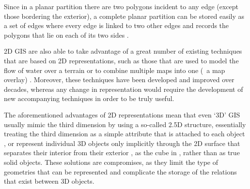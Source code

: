 Since in a planar partition there are two polygons incident to any edge (except those bordering the exterior), a complete planar partition can be stored easily as a set of edges where every edge is linked to two other edges and records the polygons that lie on each of its two sides \citep{Peucker75}.


2D GIS are also able to take advantage of a great number of existing techniques that are based on 2D representations, such as those that are used to model the flow of water over a terrain \citep{vanKreveld97} or to combine multiple maps into one (\ie\ a map overlay) \citep[\S{}2.3]{deBerg08}.
Moreover, these techniques have been developed and improved over decades, whereas any change in representation would require the development of new accompanying techniques in order to be truly useful.


The aforementioned advantages of 2D representations mean that even `3D' GIS usually mimic the third dimension by using a so-called 2.5D structure, essentially treating the third dimension as a simple attribute that is attached to each object \citep{Raper89}, or represent individual 3D objects only implicitly through the 2D surface that separates their interior from their exterior \citep{Edmonds60,Baumgart75}, as the cube in , rather than as true solid objects.
These solutions are compromises, as they limit the type of geometries that can be represented and complicate the storage of the relations that exist between 3D objects.

